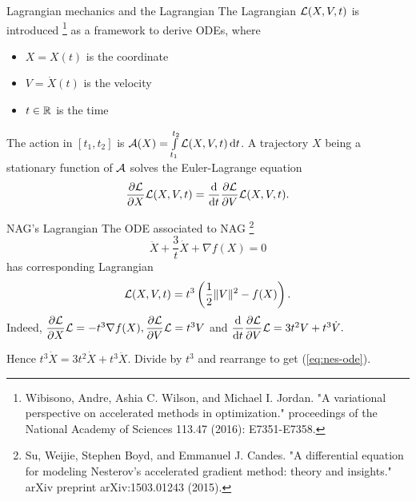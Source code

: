\begin{frame}{Lagrangian mechanics and the Lagrangian}
  The Lagrangian $\mathcal{L}(X,V,t)$ is introduced \footnote{Wibisono, Andre, Ashia C. Wilson, and Michael I. Jordan. "A variational perspective on accelerated methods in optimization." proceedings of the National Academy of Sciences 113.47 (2016): E7351-E7358.} as a framework to derive ODEs, where
  \begin{itemize}
    \item $X = X(t)$ is the coordinate
    \item $V = \dot{X}(t)$ is the velocity
    \item $t\in\mathbb{R}$ is the time
  \end{itemize}

  The action in $[t_1, t_2]$ is $\mathcal{A}(X) = \int\limits_{t_1}^{t_2} \mathcal{L}(X,V,t)\,\mathrm{d}t$. A trajectory $X$ being a stationary function of $\mathcal{A}$ solves the Euler-Lagrange equation
  \begin{equation}
    \dfrac{\partial \mathcal{L}}{\partial X} \mathcal{L} (X, V, t) = \dfrac{\mathrm{d}}{\mathrm{d}t} \dfrac{\partial \mathcal{L}}{\partial V} \mathcal{L} (X, V, t).
  \end{equation}
\end{frame}

\begin{frame}{NAG's Lagrangian}
  The ODE associated to NAG \footnote{Su, Weijie, Stephen Boyd, and Emmanuel J. Candes. "A differential equation for modeling Nesterov's accelerated gradient method: theory and insights." arXiv preprint arXiv:1503.01243 (2015).}
  \begin{equation}
    \label{eq:nes-ode}
    \ddot{X} + \dfrac{3}{t}\dot{X} + \nabla f(X) = 0
  \end{equation}
  has corresponding Lagrangian
  \begin{equation}
    \label{eq:nes-lagrangian}
    \mathcal{L} (X, V, t) = t^3\left(\dfrac{1}{2}\|V\|^2-f(X)\right).
  \end{equation}
  Indeed, $\dfrac{\partial \mathcal{L}}{\partial X} \mathcal{L} = -t^3\nabla f(X), \dfrac{\partial \mathcal{L}}{\partial V} \mathcal{L} = t^3V$ and $\dfrac{\mathrm{d}}{\mathrm{d}t}\dfrac{\partial \mathcal{L}}{\partial V} \mathcal{L} = 3t^2 V + t^3\dot{V}.$

  Hence $t^3\dot{X} = 3t^2\dot{X} + t^3\ddot{X}$. Divide by $t^3$ and rearrange to get (\ref{eq:nes-ode}).
\end{frame}

